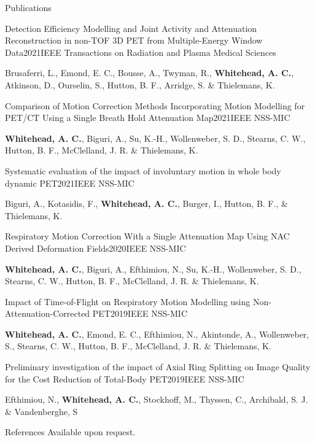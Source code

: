 \documentclass{cv}
\begin{document}
    \begin{rSection}{Publications}
        \begin{rSubsection}{Detection Efficiency Modelling and Joint Activity and Attenuation Reconstruction in non-TOF 3D PET from Multiple-Energy Window Data}{2021}{IEEE Transactions on Radiation and Plasma Medical Sciences}{}
            \item Brusaferri, L., Emond, E. C., Bousse, A., Twyman, R., {\bf Whitehead, A. C.}, Atkinson, D., Ourselin, S., Hutton, B. F., Arridge, S. \& Thielemans, K.
        \end{rSubsection}
        
        \begin{rSubsection}{Comparison of Motion Correction Methods Incorporating Motion Modelling for PET/CT Using a Single Breath Hold Attenuation Map}{2021}{IEEE NSS-MIC}{}
            \item {\bf Whitehead, A. C.}, Biguri, A., Su, K.-H., Wollenweber, S. D., Stearns, C. W., Hutton, B. F., McClelland, J. R. \& Thielemans, K.
        \end{rSubsection}
        
        \begin{rSubsection}{Systematic evaluation of the impact of involuntary motion in whole body dynamic PET}{2021}{IEEE NSS-MIC}{}
            \item Biguri, A., Kotasidis, F., {\bf Whitehead, A. C.}, Burger, I., Hutton, B. F., \& Thielemans, K.
        \end{rSubsection}
        
        \begin{rSubsection}{Respiratory Motion Correction With a Single Attenuation Map Using NAC Derived Deformation Fields}{2020}{IEEE NSS-MIC}{}
            \item {\bf Whitehead, A. C.}, Biguri, A., Efthimiou, N., Su, K.-H., Wollenweber, S. D., Stearns, C. W., Hutton, B. F., McClelland, J. R. \& Thielemans, K.
        \end{rSubsection}
        
        \begin{rSubsection}{Impact of Time-of-Flight on Respiratory Motion Modelling using Non-Attenuation-Corrected PET}{2019}{IEEE NSS-MIC}{}
            \item {\bf Whitehead, A. C.}, Emond, E. C., Efthimiou, N., Akintonde, A., Wollenweber, S., Stearns, C. W., Hutton, B. F., McClelland, J. R. \& Thielemans, K.
        \end{rSubsection}
        
        \begin{rSubsection}{ Preliminary investigation of the impact of Axial Ring Splitting on Image Quality for the Cost Reduction of Total-Body PET}{2019}{IEEE NSS-MIC}{}
            \item Efthimiou, N., {\bf Whitehead, A. C.}, Stockhoff, M., Thyssen, C., Archibald, S. J. \& Vandenberghe, S
        \end{rSubsection}
    \end{rSection}
    
    \begin{rSection}{References}
        Available upon request.
    \end{rSection}
\end{document}
